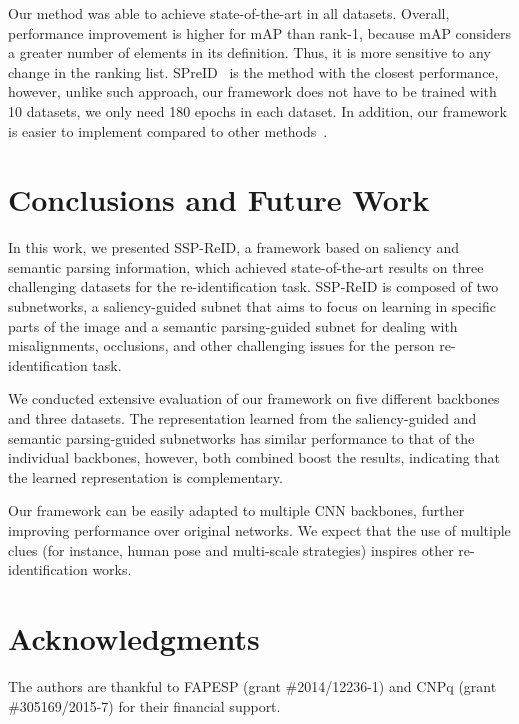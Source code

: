 \documentclass[final,3p,times,twocolumn]{elsarticle}
\begin{document}
Our method was able to achieve state-of-the-art in all datasets. Overall, performance improvement is higher for mAP than rank-1, because mAP considers a greater number of elements in its definition. Thus, it is more sensitive to any change in the ranking list. SPreID~\cite{kalayeh2018human} is the method with the closest performance, however, unlike such approach, our framework does not have to be trained with 10 datasets, we only need 180 epochs in each dataset. In addition, our framework is easier to implement compared to other methods~\cite{chang2018multi,li2018harmonious,wang2018resource,ristani2018features}.
 \section{Conclusions and Future Work}
\label{sec:conclusions}

In this work, we presented SSP-ReID, a framework based on saliency and semantic parsing information, which achieved state-of-the-art results on three challenging datasets for the re-identification task. SSP-ReID is composed of two subnetworks, a saliency-guided subnet that aims to focus on learning in specific parts of the image and a semantic parsing-guided subnet for dealing with misalignments, occlusions, and other challenging issues for the person re-identification task.

We conducted extensive evaluation of our framework on five different backbones and three datasets. The representation learned from the saliency-guided and semantic parsing-guided subnetworks has similar performance to that of the individual backbones, however, both combined boost the results, indicating that the learned representation is complementary.

Our framework can be easily adapted to multiple CNN backbones, further improving performance over original networks. We expect that the use of multiple clues (for instance, human pose and multi-scale strategies) inspires other re-identification works.
 \section{Acknowledgments}
\label{acknowledgment}

The authors are thankful to FAPESP (grant \#2014/12236-1) and CNPq (grant \#305169/2015-7) for their financial support.
 






\end{document}

